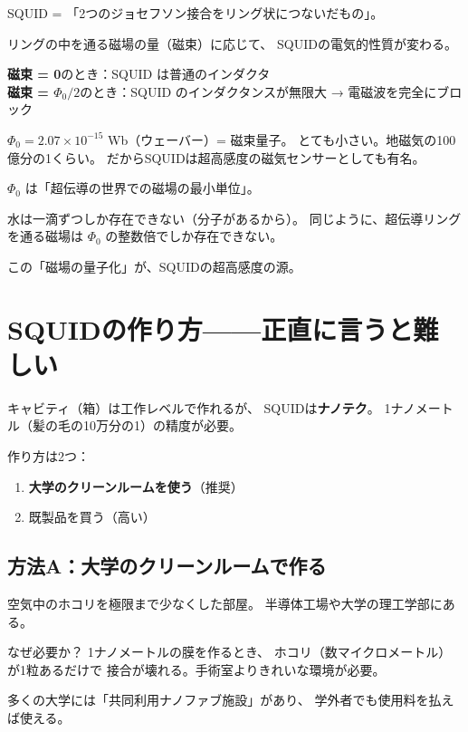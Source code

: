 \documentclass[12pt,a4paper]{article}
\begin{document}
\begin{naruhodox}[SQUIDの構造]
SQUID = 「2つのジョセフソン接合をリング状につないだもの」。

リングの中を通る磁場の量（磁束）に応じて、
SQUIDの電気的性質が変わる。

\textbf{磁束 = 0}のとき：SQUID は普通のインダクタ \\
\textbf{磁束 = $\Phi_0/2$}のとき：SQUID のインダクタンスが無限大
→ 電磁波を完全にブロック

$\Phi_0 = 2.07 \times 10^{-15}$ Wb（ウェーバー）= 磁束量子。
とても小さい。地磁気の100億分の1くらい。
だからSQUIDは超高感度の磁気センサーとしても有名。
\end{naruhodox}

\begin{tatoebabox}
$\Phi_0$ は「超伝導の世界での磁場の最小単位」。

水は一滴ずつしか存在できない（分子があるから）。
同じように、超伝導リングを通る磁場は
$\Phi_0$ の整数倍でしか存在できない。

この「磁場の量子化」が、SQUIDの超高感度の源。
\end{tatoebabox}

\section{SQUIDの作り方——正直に言うと難しい}

\begin{honestbox}[ここが一番難しい]
キャビティ（箱）は工作レベルで作れるが、
SQUIDは\textbf{ナノテク}。
1ナノメートル（髪の毛の10万分の1）の精度が必要。

作り方は2つ：
\begin{enumerate}
\item \textbf{大学のクリーンルームを使う}（推奨）
\item 既製品を買う（高い）
\end{enumerate}
\end{honestbox}

\subsection{方法A：大学のクリーンルームで作る}

\begin{naruhodox}[クリーンルームとは]
空気中のホコリを極限まで少なくした部屋。
半導体工場や大学の理工学部にある。

なぜ必要か？ 1ナノメートルの膜を作るとき、
ホコリ（数マイクロメートル）が1粒あるだけで
接合が壊れる。手術室よりきれいな環境が必要。

多くの大学には「共同利用ナノファブ施設」があり、
学外者でも使用料を払えば使える。
\end{naruhodox}
\end{document}
